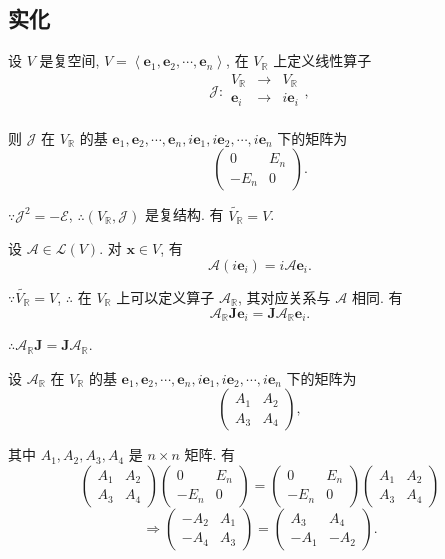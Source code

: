 \documentclass[color=black,device=normal,lang=cn,mode=geye]{elegantnote}
\begin{document}
\subsection{实化}
设 $V$ 是复空间, $V=\left<\boldsymbol{e}_1,\boldsymbol{e}_2,\cdots,\boldsymbol{e}_n\right>$, 在 $V_\mathbb{R}$ 上定义线性算子
\[\mathcal{J}:\begin{array}{rcl}
    V_\mathbb{R} & \to & V_\mathbb{R} \\
    \boldsymbol{e}_i & \to & i\boldsymbol{e}_i \\
\end{array},\]

则 $\mathcal{J}$ 在 $V_\mathbb{R}$ 的基 $\boldsymbol{e}_1,\boldsymbol{e}_2,\cdots,\boldsymbol{e}_n,i\boldsymbol{e}_1,i\boldsymbol{e}_2,\cdots,i\boldsymbol{e}_n$ 下的矩阵为
\[\begin{pmatrix}
    0 & E_n \\
    -E_n & 0
\end{pmatrix}.\]

$\because\mathcal{J}^2=-\mathcal{E}$, $\therefore(V_\mathbb{R},\mathcal{J})$ 是复结构. 有 $\widetilde{V_\mathbb{R}}=V$.

设 $\mathcal{A}\in\mathcal{L}(V)$. 对 $\boldsymbol{x}\in V$, 有
\[\mathcal{A}(i\boldsymbol{e}_i)=i\mathcal{A}\boldsymbol{e}_i.\]

$\because\widetilde{V_\mathbb{R}}=V$, $\therefore$ 在 $V_\mathbb{R}$ 上可以定义算子 $\mathcal{A}_\mathbb{R}$, 其对应关系与 $\mathcal{A}$ 相同. 有
\[\mathcal{A}_\mathbb{R}\boldsymbol{J}\boldsymbol{e}_i=\boldsymbol{J}\mathcal{A}_\mathbb{R}\boldsymbol{e}_i.\]

$\therefore\mathcal{A}_\mathbb{R}\boldsymbol{J}=\boldsymbol{J}\mathcal{A}_\mathbb{R}$.

设 $\mathcal{A}_\mathbb{R}$ 在 $V_\mathbb{R}$ 的基 $\boldsymbol{e}_1,\boldsymbol{e}_2,\cdots,\boldsymbol{e}_n,i\boldsymbol{e}_1,i\boldsymbol{e}_2,\cdots,i\boldsymbol{e}_n$ 下的矩阵为
\[\begin{pmatrix}
    A_1 & A_2 \\
    A_3 & A_4
\end{pmatrix},\]

其中 $A_1,A_2,A_3,A_4$ 是 $n\times n$ 矩阵. 有
\[\begin{pmatrix}
    A_1 & A_2 \\
    A_3 & A_4
\end{pmatrix}\begin{pmatrix}
    0 & E_n \\
    -E_n & 0
\end{pmatrix}=\begin{pmatrix}
    0 & E_n \\
    -E_n & 0
\end{pmatrix}\begin{pmatrix}
    A_1 & A_2 \\
    A_3 & A_4
\end{pmatrix}\]
\[\Rightarrow\begin{pmatrix}
    -A_2 & A_1 \\
    -A_4 & A_3
\end{pmatrix}=\begin{pmatrix}
    A_3 & A_4 \\
    -A_1 & -A_2
\end{pmatrix}.\]
\end{document}
